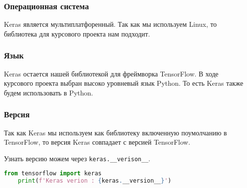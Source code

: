 \subsubsection{Операционная система}
Keras является мультиплатфоренный.
Так как мы используем Linux,
то библиотека для курсового проекта нам подходит.

\subsubsection{Язык}
Keras остается нашей библиотекой для фреймворка TensorFlow.
В ходе курсового проекта выбран высоко уровневый язык Python.
То есть Keras также будем использовать в Python.

\subsubsection{Версия}
Так как Keras мы используем как библиотеку включенную поумолчанию в TensorFlow,
то версия Keras совпадает с версией TensorFlow.

Узнать версию можем через \verb|keras.__verison__|.

\begin{lstlisting}[language=Python,]
    from tensorflow import keras
    print(f'Keras verion : {keras.__version__}')
\end{lstlisting}